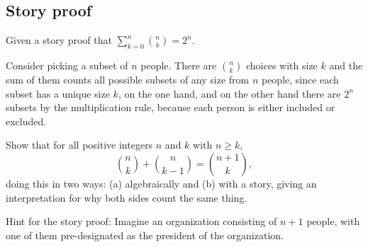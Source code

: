 {    \subsection{Story proof}
    \item %
    \oS Given a story proof that $\sum_{k=0}^{n} \binom{n}{k} = 2^n$. 
    \begin{Solution}
        \begin{storyproof}
            Consider picking a subset of $n$ people. 
            There are $\binom{n}{k}$ choices with size $k$ and the sum of them counts all possible subsets of any size from $n$ people, since each subset has a unique size $k$, on the one hand, and on the other hand there are $2^n$ subsets by the multiplication rule, because each person is either included or excluded. 
        \end{storyproof}
    \end{Solution}
    \item %
    \oS Show that for all positive integers $n$ and $k$ with $n \geq k$, 
    \begin{equation*}
        \binom{n}{k} + \binom{n}{k-1} = \binom{n+1}{k}, 
    \end{equation*}
    doing this in two ways: (a) algebraically and (b) with a story, giving an interpretation for why both sides count the same thing. 

    Hint for the story proof: Imagine an organization consisting of $n + 1$ people, with one of them pre-designated as the president of the organization. 
    \begin{Solution}
\end{Solution}}
